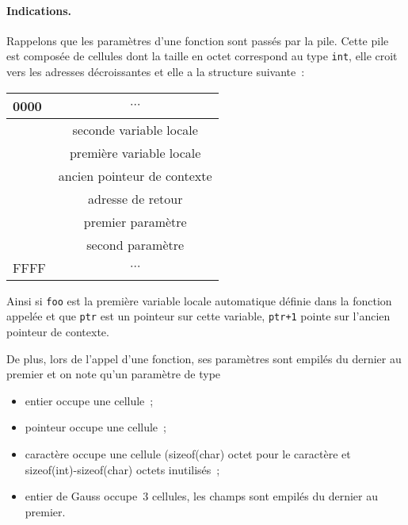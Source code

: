 \paragraph{Indications.}
Rappelons que les param\`etres d'une fonction sont pass\'es par la
pile. Cette pile est compos\'ee de cellules dont la taille en octet
correspond au type \verb?int?, elle croit vers les adresses
d\'ecroissantes et elle a la structure suivante~:
\begin{center}
  \begin{tabular}{l|c|}
    \hline 
    0000 & $\cdots$ \\ \hline
    & seconde variable locale \\ \hline
    & premi\`ere variable locale \\ \hline
    & ancien pointeur de contexte \\ \hline
    & adresse de retour \\ \hline
    & premier param\`etre \\ \hline
    & second param\`etre \\ \hline
    FFFF &$\cdots$ \\ \hline
  \end{tabular}
\end{center}
Ainsi si \verb?foo? est la premi\`ere variable locale automatique
d\'efinie dans la fonction appel\'ee et que \verb?ptr?  est un
pointeur sur cette variable, \verb?ptr+1? pointe sur l'ancien pointeur
de contexte.
\par
De plus, lors de l'appel d'une fonction, ses param\`etres sont
empil\'es du dernier au premier et on note qu'un param\`etre de type
\begin{itemize}
\item entier occupe une cellule~;
\item pointeur occupe une cellule~;
\item caract\`ere occupe une cellule (sizeof(char) octet pour le caract\`ere et
sizeof(int)-sizeof(char) octets inutilis\'es~;
\item entier de Gauss occupe~$3$ cellules, les champs sont empil\'es
  du dernier au premier.
\end{itemize}
